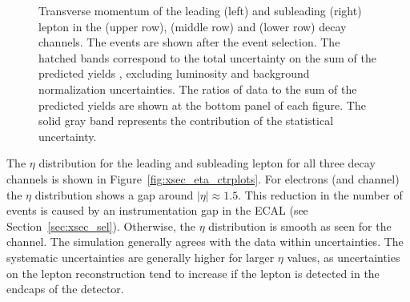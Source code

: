 \begin{figure}[htbp!]
\begin{center}
      \caption{Transverse momentum of the leading (left) and subleading (right)
        lepton in the \emu (upper row), \mumu (middle row) and \ee (lower row) decay channels.
        The events are shown after the
        event selection.  The hatched
        bands correspond to the total uncertainty on the sum of the
        predicted yields 
        , excluding luminosity and background
        normalization uncertainties. 
        The ratios of data to the sum of the predicted yields are
        shown at the bottom panel of each figure. The solid gray band
        represents the contribution of the statistical uncertainty.}  
       \label{fig:xsec_pt_ctrplots}
  \end{center}
\end{figure}

The $\eta$ distribution for the leading and subleading lepton for all three decay channels is shown in Figure~\ref{fig:xsec_eta_ctrplots}.
For electrons (\emu and \ee channel) the $\eta$ distribution shows a gap around $|\eta| \approx 1.5$. This reduction in the number of events is caused by an instrumentation gap in the ECAL (see Section~\ref{sec:xsec_sel}).
Otherwise, the $\eta$ distribution is smooth as seen for the \mumu channel.
The simulation generally agrees with the data within uncertainties. The systematic uncertainties are generally higher for larger $\eta$ values, as uncertainties on the lepton reconstruction
tend to increase if the lepton is detected in the endcaps of the detector.


